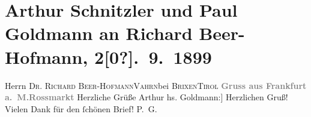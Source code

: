

         
         \renewcommand{\erwaehntePersonen}{Personen: Richard Beer-Hofmann}
         \renewcommand{\erwaehnteOrte}{Orte: Brixen, Frankfurt am Main, Roßmarkt, Tirol, Vahrn}
         \renewcommand{\erwaehnteWerke}{}
               \section[Arthur Schnitzler und Paul Goldmann an Richard Beer-Hofmann, 2{[}0?{]}. 9. 1899]{ Arthur Schnitzler und Paul Goldmann an Richard Beer-Hofmann,
               2{[}0?{]}. 9. 1899}\nopagebreak{}\rehead{ }\begin{ledgroupsized}[t]{13cm}\normalsize\beginnumbering \toendnotes[C]{\smallbreak\pagebreak[2]} 
\pstart{}{\pb}Herrn \textsc{Dr. Richard
                     Beer-Hofmann}\pend{}\pstart{}\textsc{Vahrn}\pend{}\pstart{}bei \textsc{Brixen}\pend{}\pstart{}\textsc{Tirol}\pend{}{\bigskip}\pstart
           \noindent{}\centering{}\textcolor{gray}{\textbf{{\pb}Gruss aus Frankfurt a. M.Rossmarkt}}\pend
           \pstart
           {\pb}Herzliche Grüße\pend
           \pstart \spacefill\mbox{Arthur}\pend{}\pstart
           \noindent{}{[}hs. Goldmann:{]} Herzlichen Gruß! Vielen Dank für den ſchönen
               Brief!\pend
           \pstart \spacefill\mbox{P. G.}\pend{}
         
         \endnumbering{}\end{ledgroupsized}  \newcommand{\dateiname}{L00979}\newcommand{\titel}{Arthur Schnitzler und Paul Goldmann an Richard Beer-Hofmann, 2[0?]. 9. 1899}\newcommand{\editorInnen}{Martin Anton Müller und Gerd-Hermann Susen}
      